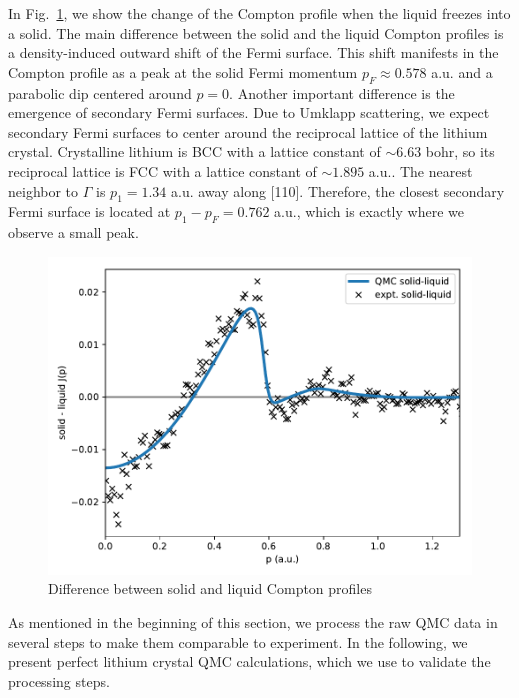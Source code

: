 \documentclass[aps,prb,showpacs,preprintnumbers,amsmath,amssymb,superscriptaddress,twocolumn]{revtex4}
\begin{document}
In Fig.~\ref{fig:s-l-djp}, we show the change of the Compton profile when the liquid freezes into a solid. The main difference between the solid and the liquid Compton profiles is a density-induced outward shift of the Fermi surface. This shift manifests in the Compton profile as a peak at the solid Fermi momentum $p_F\approx0.578$ a.u. and a parabolic dip centered around $p=0$. Another important difference is the emergence of secondary Fermi surfaces. Due to Umklapp scattering, we expect secondary Fermi surfaces to center around the reciprocal lattice of the lithium crystal. Crystalline lithium is BCC with a lattice constant of $\sim 6.63$ bohr, so its reciprocal lattice is FCC with a lattice constant of $\sim 1.895$ a.u.. The nearest neighbor to $\Gamma$ is $p_1=1.34$ a.u. away along [110]. Therefore, the closest secondary Fermi surface is located at $p_1-p_F=0.762$ a.u., which is exactly where we observe a small peak.


\begin{figure}[h]
\includegraphics[width=\linewidth]{figures/li52e_sl-djp}
\caption{Difference between solid and liquid Compton profiles\label{fig:s-l-djp}}
\end{figure}

As mentioned in the beginning of this section, we process the raw QMC data in several steps to make them comparable to experiment. In the following, we present perfect lithium crystal QMC calculations, which we use to validate the processing steps.
\end{document}
